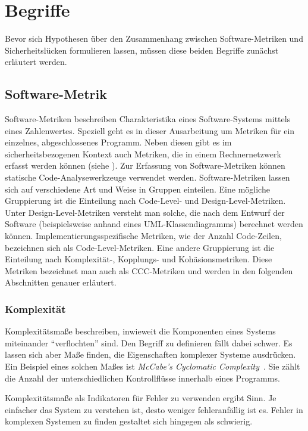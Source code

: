 \section{Begriffe}
\label{sec:begriffe}
Bevor sich Hypothesen über den Zusammenhang zwischen Software-Metriken und Sicherheitslücken formulieren lassen, müssen diese beiden Begriffe zunächst erläutert werden.

\subsection{Software-Metrik}
Software-Metriken beschreiben Charakteristika eines Software-Systems mittels eines Zahlenwertes.
Speziell geht es in dieser Ausarbeitung um Metriken für ein einzelnes, abgeschlossenes Programm.
Neben diesen gibt es im sicherheitsbezogenen Kontext auch Metriken, die in einem Rechnernetzwerk erfasst werden können (siehe \cite{cheng2014}).
Zur Erfassung von Software-Metriken können statische Code-Analysewerkzeuge verwendet werden.
Software-Metriken lassen sich auf verschiedene Art und Weise in Gruppen einteilen.
Eine mögliche Gruppierung ist die Einteilung nach Code-Level- und Design-Level-Metriken.
Unter Design-Level-Metriken versteht man solche, die nach dem Entwurf der Software (beispielsweise anhand eines UML-Klassendiagramms) berechnet werden können.
Implementierungsspezifische Metriken, wie der Anzahl Code-Zeilen, bezeichnen sich als Code-Level-Metriken.
Eine andere Gruppierung ist die Einteilung nach Komplexität-, Kopplungs- und Kohäsionsmetriken.
Diese Metriken bezeichnet man auch als CCC-Metriken und werden in den folgenden Abschnitten genauer erläutert.

\subsubsection{Komplexität}
Komplexitätsmaße beschreiben, inwieweit die Komponenten eines Systems miteinander "`verflochten"' sind.
Den Begriff zu definieren fällt dabei schwer.
Es lassen sich aber Maße finden, die Eigenschaften komplexer Systeme ausdrücken.
Ein Beispiel eines solchen Maßes ist \textit{McCabe's Cyclomatic Complexity}~\cite{mccabe1976}.
Sie zählt die Anzahl der unterschiedlichen Kontrollflüsse innerhalb eines Programms.

Komplexitätsmaße als Indikatoren für Fehler zu verwenden ergibt Sinn.
Je einfacher das System zu verstehen ist, desto weniger fehleranfällig ist es.
Fehler in komplexen Systemen zu finden gestaltet sich hingegen als schwierig.

